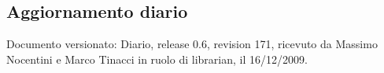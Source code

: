 \subsection{Aggiornamento diario}
Documento versionato: Diario, release 0.6, revision 171, ricevuto da Massimo 
Nocentini e Marco Tinacci in ruolo di librarian, il 16/12/2009. 